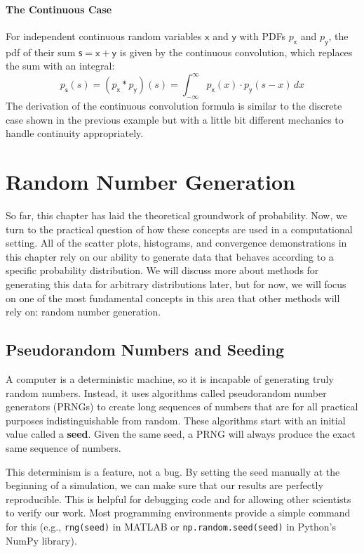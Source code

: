 \paragraph*{The Continuous Case}
For independent continuous random variables $\mathsf{x}$ and $\mathsf{y}$ with PDFs $p_{\mathsf{x}}$ and $p_{\mathsf{y}}$, the pdf of their sum $\mathsf{s} = \mathsf{x} + \mathsf{y}$ is given by the continuous convolution, which replaces the sum with an integral:
\begin{equation}
    p_{\mathsf{s}}(s) = (p_{\mathsf{x}} * p_{\mathsf{y}})(s) = \int_{-\infty}^{\infty} p_{\mathsf{x}}(x) \cdot p_{\mathsf{y}}(s-x) \,dx
\end{equation}
The derivation of the continuous convolution formula is similar to the discrete case shown in the previous example but with a little bit different mechanics to handle continuity appropriately.


\section{Random Number Generation}
So far, this chapter has laid the theoretical groundwork of probability. Now, we turn to the practical question of how these concepts are used in a computational setting. All of the scatter plots, histograms, and convergence demonstrations in this chapter rely on our ability to generate data that behaves according to a specific probability distribution. We will discuss more about methods for generating this data for arbitrary distributions later, but for now, we will focus on one of the most fundamental concepts in this area that other methods will rely on: random number generation.

\subsection{Pseudorandom Numbers and Seeding}
A computer is a deterministic machine, so it is incapable of generating truly random numbers. Instead, it uses algorithms called pseudorandom number generators (PRNGs) to create long sequences of numbers that are for all practical purposes indistinguishable from random. These algorithms start with an initial value called a \textbf{seed}. Given the same seed, a PRNG will always produce the exact same sequence of numbers.

This determinism is a feature, not a bug. By setting the seed manually at the beginning of a simulation, we can make sure that our results are perfectly reproducible. This is helpful for debugging code and for allowing other scientists to verify our work. Most programming environments provide a simple command for this (e.g., \texttt{rng(seed)} in MATLAB or \texttt{np.random.seed(seed)} in Python's NumPy library).

